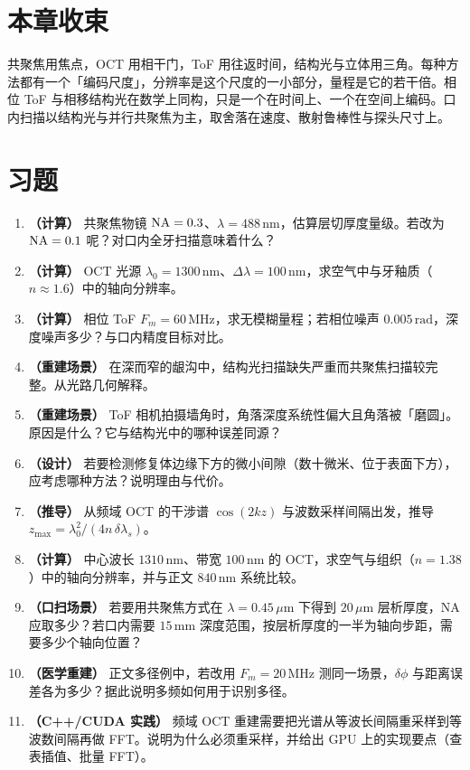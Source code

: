 \section*{本章收束}
共聚焦用焦点，OCT 用相干门，ToF 用往返时间，结构光与立体用三角。每种方法都有一个「编码尺度」，分辨率是这个尺度的一小部分，量程是它的若干倍。相位 ToF 与相移结构光在数学上同构，只是一个在时间上、一个在空间上编码。口内扫描以结构光与并行共聚焦为主，取舍落在速度、散射鲁棒性与探头尺寸上。

\section{习题}
\label{sec:ch09-exercises}

\begin{enumerate}
  \item \textbf{（计算）} 共聚焦物镜 $\mathrm{NA}=0.3$、$\lambda=488\,\mathrm{nm}$，估算层切厚度量级。若改为 $\mathrm{NA}=0.1$ 呢？对口内全牙扫描意味着什么？
  \item \textbf{（计算）} OCT 光源 $\lambda_0=1300\,\mathrm{nm}$、$\Delta\lambda=100\,\mathrm{nm}$，求空气中与牙釉质（$n\approx1.6$）中的轴向分辨率。
  \item \textbf{（计算）} 相位 ToF $F_m=60\,\mathrm{MHz}$，求无模糊量程；若相位噪声 $0.005\,\mathrm{rad}$，深度噪声多少？与口内精度目标对比。
  \item \textbf{（重建场景）} 在深而窄的龈沟中，结构光扫描缺失严重而共聚焦扫描较完整。从光路几何解释。
  \item \textbf{（重建场景）} ToF 相机拍摄墙角时，角落深度系统性偏大且角落被「磨圆」。原因是什么？它与结构光中的哪种误差同源？
  \item \textbf{（设计）} 若要检测修复体边缘下方的微小间隙（数十微米、位于表面下方），应考虑哪种方法？说明理由与代价。
  \item \textbf{（推导）} 从频域 OCT 的干涉谱 $\cos(2kz)$ 与波数采样间隔出发，推导 $z_{\max}=\lambda_0^2/(4n\,\delta\lambda_s)$。
  \item \textbf{（计算）} 中心波长 $1310\,\mathrm{nm}$、带宽 $100\,\mathrm{nm}$ 的 OCT，求空气与组织（$n=1.38$）中的轴向分辨率，并与正文 $840\,\mathrm{nm}$ 系统比较。
  \item \textbf{（口扫场景）} 若要用共聚焦方式在 $\lambda=0.45\,\mu\mathrm{m}$ 下得到 $20\,\mu\mathrm{m}$ 层析厚度，$\mathrm{NA}$ 应取多少？若口内需要 $15\,\mathrm{mm}$ 深度范围，按层析厚度的一半为轴向步距，需要多少个轴向位置？
  \item \textbf{（医学重建）} 正文多径例中，若改用 $F_m=20\,\mathrm{MHz}$ 测同一场景，$\delta\phi$ 与距离误差各为多少？据此说明多频如何用于识别多径。
  \item \textbf{（C++/CUDA 实践）} 频域 OCT 重建需要把光谱从等波长间隔重采样到等波数间隔再做 FFT。说明为什么必须重采样，并给出 GPU 上的实现要点（查表插值、批量 FFT）。
\end{enumerate}

